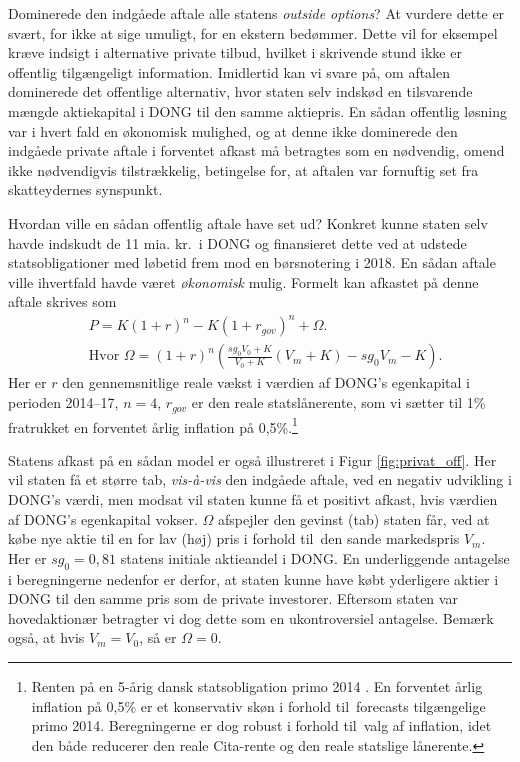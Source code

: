 \documentclass{article}
\begin{document}
Dominerede den indgåede aftale alle statens \emph{outside options}? At vurdere dette er svært, for ikke at sige umuligt, for en ekstern bedømmer. Dette vil for eksempel kræve indsigt i alternative private tilbud, hvilket i skrivende stund ikke er offentlig tilgængeligt information.
Imidlertid kan vi svare på, om aftalen dominerede det offentlige alternativ, hvor staten selv indskød en tilsvarende mængde aktiekapital i DONG til den samme aktiepris. En sådan offentlig løsning var i hvert fald en økonomisk mulighed, og at denne ikke dominerede den indgåede private aftale i forventet afkast må betragtes som en nødvendig, omend ikke nødvendigvis tilstrækkelig, betingelse for, at aftalen var fornuftig set fra skatteydernes synspunkt. 

Hvordan ville en sådan offentlig aftale have set ud? Konkret kunne staten selv havde indskudt de 11 mia. kr.\ i DONG og finansieret dette ved at udstede statsobligationer med løbetid frem mod en børsnotering i 2018. En sådan aftale ville ihvertfald havde været \emph{økonomisk} mulig. Formelt kan afkastet på denne aftale skrives som 
\begin{align}
&P=K(1+r)^n-K(1+r_{gov})^n +\Omega. \label{eq:gov_capital} \\
&\text{Hvor } \Omega=(1+r)^n\left( \frac{sg_0 V_0+K}{V_0+K} \left( V_m+K \right)-sg_0 V_m -K\right).\nonumber
\end{align}
Her er $r$ den gennemsnitlige reale vækst i værdien af DONG's egenkapital i perioden 2014--17, $n=4$, $r_{\mathit{gov}}$ er den reale statslånerente, som vi sætter til 1\% fratrukket en forventet årlig inflation på 0,5\%.\footnote{Renten på en 5-årig dansk statsobligation primo 2014 \citep{NB2014}. En forventet årlig inflation på 0,5\% er et konservativ skøn i forhold til\ forecasts tilgængelige primo 2014. Beregningerne er dog robust i forhold til\ valg af inflation, idet den både reducerer den reale Cita-rente og den reale statslige lånerente.}

Statens afkast på en sådan model er også illustreret i Figur \ref{fig:privat_off}. Her vil staten få et større tab, \emph{vis-\`{a}-vis} den indgåede aftale, ved en negativ udvikling i DONG's værdi, men modsat vil staten kunne få et positivt afkast, hvis værdien af DONG's egenkapital vokser. $\Omega$ afspejler den gevinst (tab) staten får, ved at købe nye aktie til en for lav (høj) pris i forhold til\ den sande markedspris $V_m$. Her er $sg_0=0{,}81$ statens initiale aktieandel i DONG. En underliggende antagelse i beregningerne nedenfor er derfor, at staten kunne have købt yderligere aktier i DONG til den samme pris som de private investorer. Eftersom staten var hovedaktionær betragter vi dog dette som en ukontroversiel antagelse. Bemærk også, at hvis $V_m=V_0$, så er $\Omega=0$.
\end{document}
